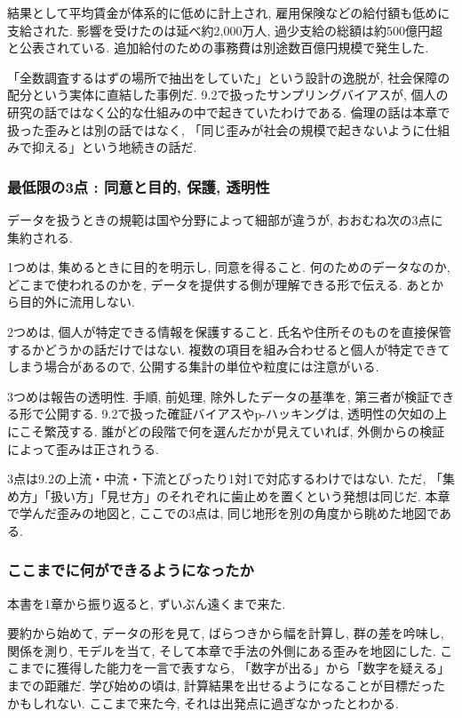 結果として平均賃金が体系的に低めに計上され, 雇用保険などの給付額も低めに支給された.
影響を受けたのは延べ約2{,}000万人, 過少支給の総額は約500億円超と公表されている.
追加給付のための事務費は別途数百億円規模で発生した.

「全数調査するはずの場所で抽出をしていた」という設計の逸脱が, 社会保障の配分という実体に直結した事例だ.
9.2で扱ったサンプリングバイアスが, 個人の研究の話ではなく公的な仕組みの中で起きていたわけである.
倫理の話は本章で扱った歪みとは別の話ではなく, 「同じ歪みが社会の規模で起きないように仕組みで抑える」という地続きの話だ.

\subsubsection*{最低限の3点 : 同意と目的, 保護, 透明性}

データを扱うときの規範は国や分野によって細部が違うが, おおむね次の3点に集約される.

1つめは, 集めるときに目的を明示し, 同意を得ること.
何のためのデータなのか, どこまで使われるのかを, データを提供する側が理解できる形で伝える.
あとから目的外に流用しない.

2つめは, 個人が特定できる情報を保護すること.
氏名や住所そのものを直接保管するかどうかの話だけではない.
複数の項目を組み合わせると個人が特定できてしまう場合があるので, 公開する集計の単位や粒度には注意がいる.

3つめは報告の透明性.
手順, 前処理, 除外したデータの基準を, 第三者が検証できる形で公開する.
9.2で扱った確証バイアスやp-ハッキングは, 透明性の欠如の上にこそ繁茂する.
誰がどの段階で何を選んだかが見えていれば, 外側からの検証によって歪みは正されうる.

3点は9.2の上流・中流・下流とぴったり1対1で対応するわけではない. ただ, 「集め方」「扱い方」「見せ方」のそれぞれに歯止めを置くという発想は同じだ.
本章で学んだ歪みの地図と, ここでの3点は, 同じ地形を別の角度から眺めた地図である.

\subsubsection*{ここまでに何ができるようになったか}

本書を1章から振り返ると, ずいぶん遠くまで来た.

要約から始めて, データの形を見て, ばらつきから幅を計算し, 群の差を吟味し, 関係を測り, モデルを当て, そして本章で手法の外側にある歪みを地図にした.
ここまでに獲得した能力を一言で表すなら, 「数字が出る」から「数字を疑える」までの距離だ.
学び始めの頃は, 計算結果を出せるようになることが目標だったかもしれない.
ここまで来た今, それは出発点に過ぎなかったとわかる.

